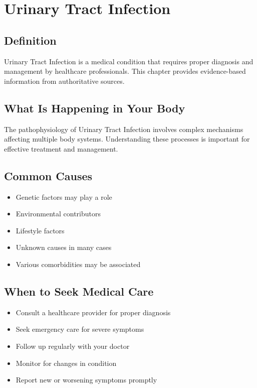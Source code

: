 
\chapter{Urinary Tract Infection}

\section*{Definition}
Urinary Tract Infection is a medical condition that requires proper diagnosis and management by healthcare professionals. This chapter provides evidence-based information from authoritative sources.

\section*{What Is Happening in Your Body}
The pathophysiology of Urinary Tract Infection involves complex mechanisms affecting multiple body systems. Understanding these processes is important for effective treatment and management.

\section*{Common Causes}
\begin{itemize}
  \item Genetic factors may play a role
  \item Environmental contributors
  \item Lifestyle factors
  \item Unknown causes in many cases
  \item Various comorbidities may be associated
\end{itemize}

\section*{When to Seek Medical Care}
\begin{itemize}
  \item Consult a healthcare provider for proper diagnosis
  \item Seek emergency care for severe symptoms
  \item Follow up regularly with your doctor
  \item Monitor for changes in condition
  \item Report new or worsening symptoms promptly
\end{itemize}

